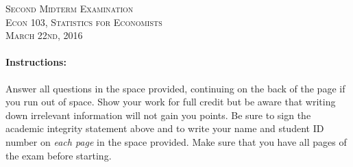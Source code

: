 \documentclass[addpoints,12pt]{exam}
\begin{document}
\begin{center}
\textsc{\large Second Midterm Examination\\ \normalsize Econ 103, Statistics for Economists \\ \vspace{0.5em} March 22nd, 2016}

\vspace{2em}



\end{center}


\vspace{2em}
\begin{center}
\end{center}
\vspace{0.2in}

\vspace{0.2in}

\noindent{}

\vspace{0.2in}

\noindent{}
\hfill
{}

\vspace{2em}

\begin{center}
  \gradetable[h][questions]
\end{center}

\vspace{2em}

\paragraph{Instructions:} Answer all questions in the space provided, continuing on the back of the page if you run out of space. Show your work for full credit but be aware that writing down irrelevant information will not gain you points. Be sure to sign the academic integrity statement above and to write your name and student ID number on \emph{each page} in the space provided. Make sure that you have all pages of the exam before starting.
\end{document}
